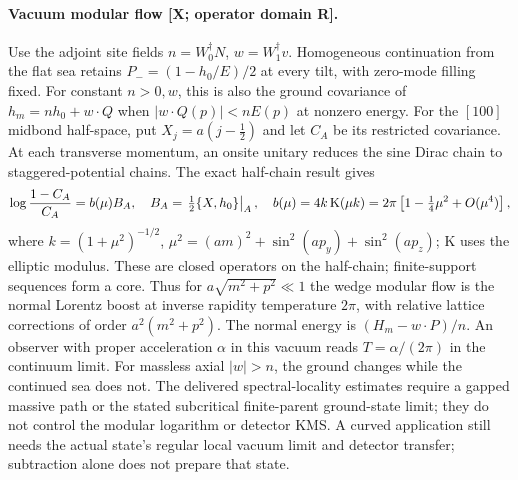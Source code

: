 \paragraph{Vacuum modular flow [X; operator domain R].}
Use the adjoint site fields $n=W_0^\dagger N$, $w=W_1^\dagger v$.
Homogeneous continuation from the flat sea retains
$P_-=(1-h_0/E)/2$ at every tilt, with zero-mode filling fixed.
For constant $n>0,w$, this is also the ground covariance of
$h_m=nh_0+w\cdot Q$ when
$|w\cdot Q(p)|<nE(p)$ at nonzero energy.
For the $[100]$ midbond half-space, put
$X_j=a(j-\tfrac12)$ and let $C_A$ be its restricted covariance.  At each transverse
momentum, an onsite unitary reduces the sine Dirac chain to staggered-potential
chains.  The exact half-chain result gives
\[
 \log{1-C_A\over C_A}=b(\mu)B_A,\quad
 B_A=\left.\tfrac12\{X,h_0\}\right|_A,\quad
 b(\mu)=4k\,\mathrm K\!\left(\mu k\right)
       =2\pi\left[1-\tfrac14\mu^2+O(\mu^4)\right],
\]
where $k=(1+\mu^2)^{-1/2}$,
$\mu^2=(am)^2+\sin^2(ap_y)+\sin^2(ap_z)$; $\mathrm K$ uses the elliptic
modulus.  These are closed operators on the half-chain;
finite-support sequences form a core.  Thus for $a\sqrt{m^2+p^2}\ll1$
the wedge modular flow is the normal Lorentz boost at inverse rapidity
temperature $2\pi$, with relative lattice corrections of order
$a^2(m^2+p^2)$.  The normal energy is $(H_m-w\cdot P)/n$.
An observer with proper acceleration $\alpha$ in this vacuum reads
$T=\alpha/(2\pi)$ in the continuum limit.
For massless axial $|w|>n$, the ground changes while the continued sea does not.
The delivered spectral-locality estimates require a gapped massive path or
the stated subcritical finite-parent ground-state limit; they do not control
the modular logarithm or detector KMS.
A curved application still needs the actual state's regular local vacuum
limit and detector transfer; subtraction alone does not prepare that state.
